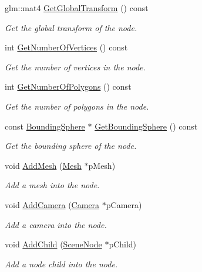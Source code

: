 \begin{DoxyCompactItemize}
glm\+::mat4 \hyperlink{class_scene_node_a022ed44829491fd01f4245f8b595adda}{Get\+Global\+Transform} () const 
\begin{DoxyCompactList}\small\item\em Get the global transform of the node. \end{DoxyCompactList}\item 
int \hyperlink{class_scene_node_a8d8679be06927ade78f38dae66e6005e}{Get\+Number\+Of\+Vertices} () const 
\begin{DoxyCompactList}\small\item\em Get the number of vertices in the node. \end{DoxyCompactList}\item 
int \hyperlink{class_scene_node_a854d028a5dd8f142233aeb4ed8963b1e}{Get\+Number\+Of\+Polygons} () const 
\begin{DoxyCompactList}\small\item\em Get the number of polygons in the node. \end{DoxyCompactList}\item 
const \hyperlink{class_bounding_sphere}{Bounding\+Sphere} $\ast$ \hyperlink{class_scene_node_a51cb72b965f1b6c3e90cd32d2fbe0b70}{Get\+Bounding\+Sphere} () const 
\begin{DoxyCompactList}\small\item\em Get the bounding sphere of the node. \end{DoxyCompactList}\item 
void \hyperlink{class_scene_node_a59d422a4a9eda1f61f0f6b396454824a}{Add\+Mesh} (\hyperlink{class_mesh}{Mesh} $\ast$p\+Mesh)
\begin{DoxyCompactList}\small\item\em Add a mesh into the node. \end{DoxyCompactList}\item 
void \hyperlink{class_scene_node_a53ae9d1ceb8f2c9121a98960d30f98ab}{Add\+Camera} (\hyperlink{class_camera}{Camera} $\ast$p\+Camera)
\begin{DoxyCompactList}\small\item\em Add a camera into the node. \end{DoxyCompactList}\item 
void \hyperlink{class_scene_node_abcabdce00df9d3d560427e74fc829a82}{Add\+Child} (\hyperlink{class_scene_node}{Scene\+Node} $\ast$p\+Child)
\begin{DoxyCompactList}\small\item\em Add a node child into the node. \end{DoxyCompactList}\item 

\end{DoxyCompactItemize}
